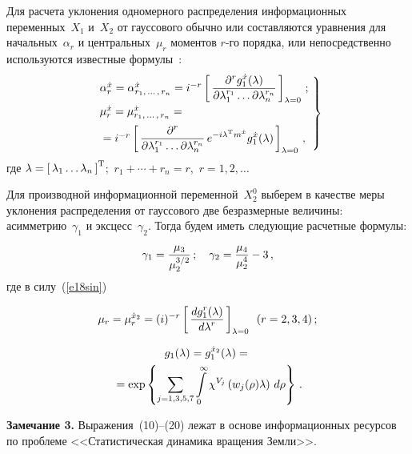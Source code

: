 \begin{multicols}{2}
Для расчета уклонения одномерного распределения информационных переменных~$X_1$ и~$X_2$
 от гауссового обычно или составляются уравнения для
начальных~$\alpha_r$ и центральных~$\mu_r$ моментов $r$-го порядка,  или непосредственно используются 
известные формулы~\cite{7sin, 8sin}:
\begin{equation}
\left.
\!\begin{array}{l}
    \alpha_r^{\dot{x}} =\alpha_{r_1,\,\ldots\,,\, r_n}^{\dot{x}} = i^{-r}\left[\,
    \displaystyle\frac{\displaystyle \partial^r g_1^{\dot{x}}(\lambda)\mathstrut}{\displaystyle  \partial \lambda_1^{r_1}\ldots \partial 
    \lambda_n^{r_n}\mathstrut}\,\right]_{\lambda=0}\,;\\[9pt]
    \mu_r^{\dot{x}} =\mu_{r_1,\,\ldots\,,\, r_n}^{\dot{x}}= {}\\[6pt]
  {}= i^{-r}\left[\,
\displaystyle\frac{\displaystyle \partial^r\mathstrut}{\displaystyle  \partial \lambda_1^{r_1}\ldots \partial \lambda_n^{r_n}\mathstrut}\,e^{-i\lambda^{\mathrm{T}} 
m^{\dot{x}}}g_1^{\dot{x}}(\lambda)\,\right]_{\lambda=0}\,,
\end{array}\!
\right\}\!
\label{e18sin}
\end{equation}
где
$\lambda=\left[\, \lambda_1\ldots \lambda_n\,\right]^{\mathrm{T}}$;\  $r_1+\cdots+r_n = r$,\
$r=1, 2,\ldots$


Для производной информационной переменной~$X_2^0$ выберем в качестве меры уклонения распределения 
от гауссового две безразмерные величины: асимметрию~$\gamma_1$ и эксцесс~$\gamma_2$. Тогда будем иметь следующие расчетные формулы:
\begin{equation} 
\gamma_1 =\displaystyle\frac{\displaystyle \mu_3\mathstrut}{\displaystyle \mu_2^{3/2}\mathstrut}\,;\quad \gamma_2 = \displaystyle\frac{\displaystyle \mu_4\mathstrut}{\displaystyle  \mu_2^4\mathstrut}-3\,,
\label{e19sin}
\end{equation}
где в силу~(\ref{e18sin})

\pagebreak

\noindent
    \begin{equation}
    \mu_r = \mu_r^{\dot{x}_2}= (i)^{-r} \left[\, \displaystyle\frac{\displaystyle d g_1^r(\lambda)\mathstrut}{\displaystyle d \lambda^r\mathstrut}\,\right]_{\lambda=0} \enskip (r=2, 3, 4)\,;
    \label{e20sin}
    \end{equation}
    
    \vspace*{-12pt}
    
    \noindent
\begin{multline}
g_1(\lambda) =g_1^{\dot{x}_2}(\lambda) ={}\\
{}=\exp\left\{ \sum\limits_{j=1,3,5,7}\int\limits_0^\infty \chi^{V_j} \left(w_j (\rho) \lambda\right)\, d\rho\right\}\,.
\label{e21sin}
\end{multline}

\smallskip
\noindent
\textbf{Замечание 3.} Выражения~(10)--(20) лежат в основе информационных ресурсов по проблеме
 <<Ста\-ти\-сти\-че\-ская динамика вращения Земли>>.
 


\end{multicols}
